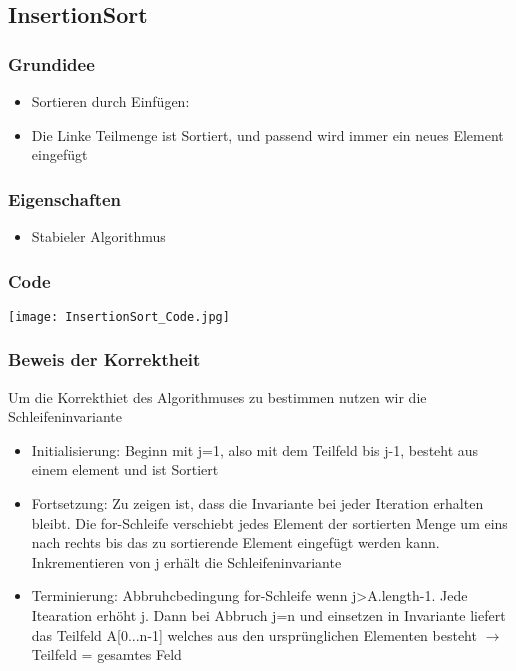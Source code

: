	\subsection{InsertionSort} 
		\begin{minipage}[t]{0.5\textwidth}
			\subsubsection{Grundidee}
				\begin{itemize}
					\item Sortieren durch Einfügen:
					\item Die Linke Teilmenge ist Sortiert, und passend wird immer ein neues Element eingefügt 
				\end{itemize}
					
				\subsubsection{Eigenschaften}
					\begin{itemize}
						\item Stabieler Algorithmus
					\end{itemize}
		\end{minipage}
		\begin{minipage}[t]{0.45\textwidth}
			\subsubsection{Code}
				\begin{center}
					\texttt{[image: InsertionSort\_Code.jpg]}
				\end{center}
		\end{minipage}
		\vspace{0.5cm}
		
		
		\subsubsection{Beweis der Korrektheit}
			Um die Korrekthiet des Algorithmuses zu bestimmen nutzen wir die Schleifeninvariante
			\begin{itemize}
				\item Initialisierung: Beginn mit j=1, also mit dem Teilfeld bis j-1, besteht aus einem element und ist Sortiert
				\item Fortsetzung: Zu zeigen ist, dass die Invariante bei jeder Iteration erhalten bleibt.
					Die for-Schleife verschiebt jedes Element der sortierten Menge um eins nach rechts bis das zu
					sortierende Element eingefügt werden kann. Inkrementieren von j erhält die Schleifeninvariante
				\item Terminierung: Abbruhcbedingung for-Schleife wenn j>A.length-1. Jede Itearation erhöht j.
					Dann bei Abbruch j=n und einsetzen in Invariante liefert das Teilfeld A[0...n-1] welches aus den
					ursprünglichen Elementen besteht $\rightarrow$ Teilfeld = gesamtes Feld
			\end{itemize}
			\vspace{1.5cm}
		
